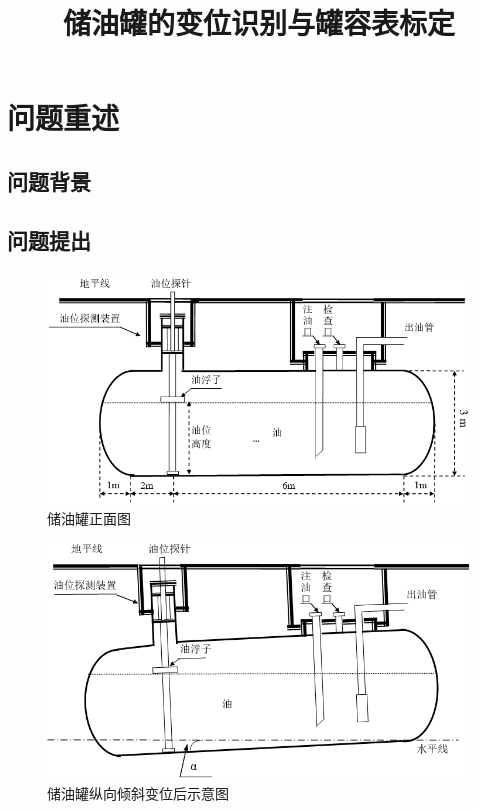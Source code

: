 \documentclass{cumcmthesis}
\title{储油罐的变位识别与罐容表标定}
\begin{document}
 \maketitle
 \begin{abstract}


\keywords{}
\end{abstract}


\newpage

\section{问题重述}
    \subsection{问题背景}
    

    \subsection{问题提出}
    
    


\begin{figure}[H]
\begin{center}
\includegraphics[scale=0.6]{figure1.png}
\caption{储油罐正面图}
\end{center}
\end{figure}

\begin{figure}[H]
\begin{center}
\includegraphics[scale=0.6]{figure2.png}
\caption{储油罐纵向倾斜变位后示意图}
\end{center}
\end{figure}
\end{document}
